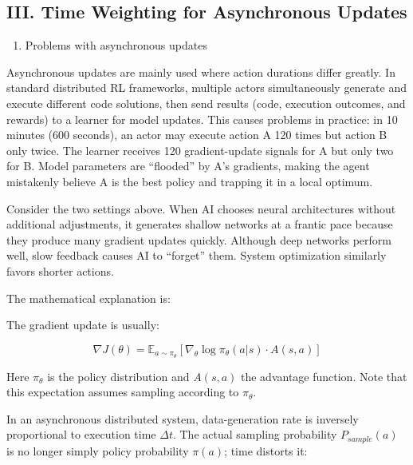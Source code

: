 \hypertarget{iii.-time-weighting-for-asynchronous-updates}{%
\subsection{III. Time Weighting for Asynchronous Updates}\label{iii.-time-weighting-for-asynchronous-updates}}

\begin{enumerate}
\def\labelenumi{\arabic{enumi}.}
\tightlist
\item
  Problems with asynchronous updates
\end{enumerate}

Asynchronous updates are mainly used where action durations differ greatly. In standard distributed RL frameworks, multiple actors simultaneously generate and execute different code solutions, then send results (code, execution outcomes, and rewards) to a learner for model updates. This causes problems in practice: in 10 minutes (600 seconds), an actor may execute action A 120 times but action B only twice. The learner receives 120 gradient-update signals for A but only two for B. Model parameters are ``flooded'' by A's gradients, making the agent mistakenly believe A is the best policy and trapping it in a local optimum.

Consider the two settings above. When AI chooses neural architectures without additional adjustments, it generates shallow networks at a frantic pace because they produce many gradient updates quickly. Although deep networks perform well, slow feedback causes AI to ``forget'' them. System optimization similarly favors shorter actions.

The mathematical explanation is:

The gradient update is usually:

\[
\nabla J(\theta)=\mathbb{E}_{a\sim\pi_\theta}\left[\nabla_\theta\log\pi_\theta(a|s)\cdot A(s,a)\right]
\]

Here \(\pi_\theta\) is the policy distribution and \(A(s,a)\) the advantage function. Note that this expectation assumes sampling according to \(\pi_\theta\).

In an asynchronous distributed system, data-generation rate is inversely proportional to execution time \(\Delta t\). The actual sampling probability \(P_{sample}(a)\) is no longer simply policy probability \(\pi(a)\); time distorts it:

